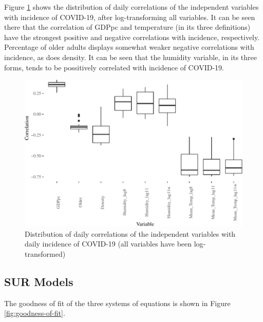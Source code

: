 \documentclass[]{elsarticle} %
\makeatletter
\def\maxwidth{\ifdim\Gin@nat@width>\linewidth\linewidth
\else\Gin@nat@width\fi}
\let\Oldincludegraphics\includegraphics
\renewcommand{\includegraphics}[1]{\Oldincludegraphics[width=\maxwidth]{#1}}
\makeatother
\begin{document}
Figure \ref{fig:daily-correlations} shows the distribution of daily
correlations of the independent variables with incidence of COVID-19,
after log-transforming all variables. It can be seen there that the
correlation of GDPpc and temperature (in its three definitions) have the
strongest positive and negative correlations with incidence,
respectively. Percentage of older adults displays somewhat weaker
negative correlations with incidence, as does density. It can be seen
that the humidity variable, in its three forms, tends to be possitively
correlated with incidence of COVID-19.

\begin{figure}
\centering
\includegraphics{Environmental-Correlates-of-COVID19-Spain_files/figure-latex/daily-correlations-1.pdf}
\caption{\label{fig:daily-correlations}Distribution of daily
correlations of the independent variables with daily incidence of
COVID-19 (all variables have been log-transformed)}
\end{figure}

\hypertarget{sur-models}{%
\subsection{SUR Models}\label{sur-models}}

The goodness of fit of the three systems of equations is shown in Figure
\ref{fig:goodness-of-fit}.
\end{document}
